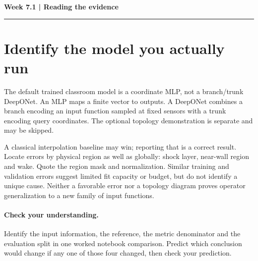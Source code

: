 \documentclass[11pt]{article}
\begin{document}
\noindent\textbf{Week 7.1 | Reading the evidence}\par\medskip\hrule\medskip
\section*{Identify the model you actually run}
The default trained classroom model is a coordinate MLP, not a branch/trunk
DeepONet. An MLP maps a finite vector to outputs. A DeepONet combines a branch
encoding an input function sampled at fixed sensors with a trunk encoding query
coordinates. The optional topology demonstration is separate and may be skipped.

A classical interpolation baseline may win; reporting that is a correct result.
Locate errors by physical region as well as globally: shock layer, near-wall
region and wake. Quote the region mask and normalization. Similar training and
validation errors suggest limited fit capacity or budget, but do not identify a
unique cause. Neither a favorable error nor a topology diagram proves operator
generalization to a new family of input functions.
\paragraph{Check your understanding.}
Identify the input information, the reference, the metric denominator and the
evaluation split in one worked notebook comparison. Predict which conclusion
would change if any one of those four changed, then check your prediction.
\end{document}
